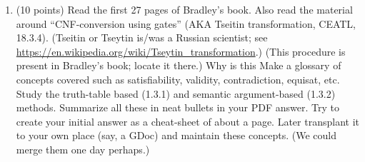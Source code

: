 \documentclass[11pt]{article}
\begin{document}

\begin{enumerate}
\item (10 points) Read the first 27 pages of Bradley's book.
  Also read the material around ``CNF-conversion using gates'' (AKA Tseitin transformation,
  CEATL, 18.3.4).
  (Tseitin or Tseytin is/was a Russian scientist; see
  \url{https://en.wikipedia.org/wiki/Tseytin_transformation}.)
  (This procedure is present in Bradley's book; locate it there.)
  Why is this 
  Make a glossary of concepts covered
  such as satisfiability, validity, contradiction, equisat, etc. Study the truth-table based
  (1.3.1) and semantic argument-based (1.3.2) methods. Summarize all these in neat bullets
  in your PDF answer.
  Try to create your initial answer as a cheat-sheet of about a page. Later transplant it
  to your own place (say, a GDoc) and maintain these concepts. (We could merge them one day perhaps.)




\newlength{\minpagw}
\settowidth{\minpagw}{\hspace{40em}}

\begin{minipage}{\minpagw}
\end{minipage}

\clearpage



\end{enumerate}
\end{document}
